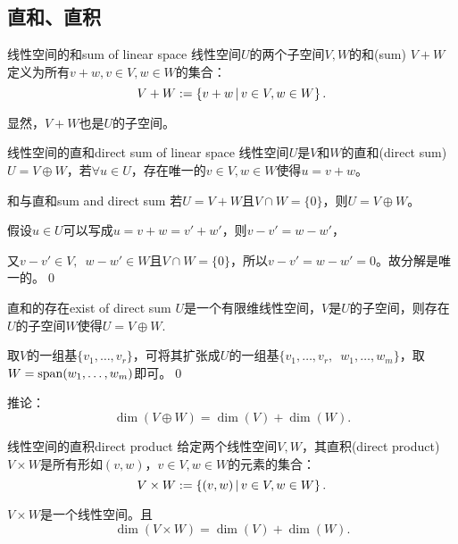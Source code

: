 \subsection{直和、直积}
\begin{definition}{线性空间的和}{sum of linear space}
	线性空间$U$的两个子空间$V,W$的和(sum) $V+W$定义为所有$v+w,v\in V,w\in W$的集合：
	\[
		V+W:=\left\{v+w\,\middle\vert\,v\in V,w\in W\right\}.
	\]
\end{definition}
显然，$V+W$也是$U$的子空间。
\begin{definition}{线性空间的直和}{direct sum of linear space}
	线性空间$U$是$V$和$W$的直和(direct sum) $U=V\oplus W$，若$\forall u\in U$，存在唯一的$v\in V,w\in W$使得$u=v+w$。
\end{definition}
\begin{theorem}{和与直和}{sum and direct sum}
	若$U=V+W$且$V\cap W=\{0\}$，则$U=V\oplus W$。
\end{theorem}
\prf 假设$u\in U$可以写成$u=v+w=v'+w'$，则$v-v'=w-w'$，

又$v-v'\in V,\enspace w-w'\in W$且$V\cap W=\{0\}$，所以$v-v'=w-w'=0$。故分解是唯一的。\qed
\begin{theorem}{直和的存在}{exist of direct sum}
	$U$是一个有限维线性空间，$V$是$U$的子空间，则存在$U$的子空间$W$使得$U=V\oplus W.$
\end{theorem}
\prf 取$V$的一组基$\{v_1,\ldots,v_r\}$，可将其扩张成$U$的一组基$\{v_1,\ldots,v_r,$\ $w_1,\ldots,w_m\}$，取$W=\operatorname{span}(w_1,\ldots,w_m)$即可。\qed

推论：
\[
	\dim(V\oplus W)=\dim(V)+\dim(W).
\]
\begin{definition}{线性空间的直积}{direct product}
	给定两个线性空间$V,W$，其直积(direct product) $V\times W$是所有形如$(v,w)，v\in V,w\in W$的元素的集合：
	\[
		V\times W:=\left\{(v,w)\,\middle\vert\,v\in V,w\in W\right\}.
	\]
\end{definition}
$V\times W$是一个线性空间。且
\[
	\dim(V\times W)=\dim(V)+\dim(W).
\]
